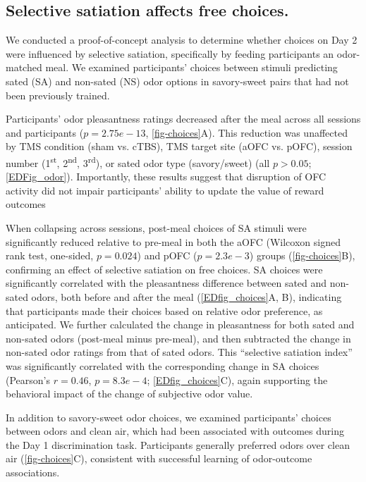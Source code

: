 \documentclass[lineno,sn-basic]{sn-jnl}%
\begin{document}
\subsection{Selective satiation affects free choices.}
\label{subsec-choices}

We conducted a proof-of-concept analysis to determine whether choices on Day 2 were influenced by selective satiation, specifically by feeding participants an odor-matched meal. We examined participants' choices between stimuli predicting sated (SA) and non-sated (NS) odor options in savory-sweet pairs that had not been previously trained. 

Participants' odor pleasantness ratings decreased after the meal across all sessions and participants ($p = 2.75e-13$, \autoref{fig-choices}A). This reduction was unaffected by TMS condition (sham vs. cTBS), TMS target site (aOFC vs. pOFC), session number (1\textsuperscript{st}, 2\textsuperscript{nd}, 3\textsuperscript{rd}), or sated odor type (savory/sweet) (all $p>0.05$; \ref{EDFig_odor}). Importantly, these results suggest that disruption of OFC activity did not impair participants' ability to update the value of reward outcomes \citep{RN454,rhodes13,HowRey2020} 

When collapsing across sessions, post-meal choices of SA stimuli were significantly reduced relative to pre-meal in both the aOFC (Wilcoxon signed rank test, one-sided, $p = 0.024$) and pOFC ($p = 2.3e-3$) groups (\autoref{fig-choices}B), confirming an effect of selective satiation on free choices. SA choices were significantly correlated with the pleasantness difference between sated and non-sated odors, both before and after the meal (\ref{EDfig_choices}A, B), indicating that participants made their choices based on relative odor preference, as anticipated. We further calculated the change in pleasantness for both sated and non-sated odors (post-meal minus pre-meal), and then subtracted the change in non-sated odor ratings from that of sated odors. This ``selective satiation index'' was significantly correlated with the corresponding change in SA choices (Pearson's $r = 0.46$, $p = 8.3e-4$; \ref{EDfig_choices}C), again supporting the behavioral impact of the change of subjective odor value. 

In addition to savory-sweet odor choices, we examined participants’ choices between odors and clean air, which had been associated with outcomes during the Day 1 discrimination task. Participants generally preferred odors over clean air (\autoref{fig-choices}C), consistent with successful learning of odor-outcome associations. 
\end{document}
